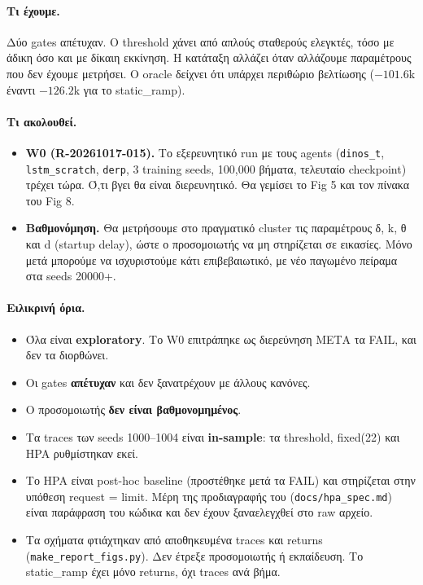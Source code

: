 \documentclass[11pt,a4paper]{article}
\newcommand{\kode}[1]{\texttt{#1}}
\begin{document}
\paragraph{Τι έχουμε.} Δύο gates απέτυχαν. Ο threshold χάνει από απλούς σταθερούς ελεγκτές, τόσο με άδικη όσο και με δίκαιη εκκίνηση. Η κατάταξη αλλάζει όταν αλλάζουμε παραμέτρους που δεν έχουμε μετρήσει. Ο oracle δείχνει ότι υπάρχει περιθώριο βελτίωσης ($-101.6$k έναντι $-126.2$k για το static\_ramp).

\paragraph{Τι ακολουθεί.}
\begin{itemize}
\item \textbf{W0 (R-20261017-015).} Το εξερευνητικό run με τους agents (\kode{dinos\_t}, \kode{lstm\_scratch}, \kode{derp}, 3 training seeds, 100,000 βήματα, τελευταίο checkpoint) τρέχει τώρα. Ό,τι βγει θα είναι διερευνητικό. Θα γεμίσει το Fig 5 και τον πίνακα του Fig 8.
\item \textbf{Βαθμονόμηση.} Θα μετρήσουμε στο πραγματικό cluster τις παραμέτρους δ, k, θ και d (startup delay), ώστε ο προσομοιωτής να μη στηρίζεται σε εικασίες. Μόνο μετά μπορούμε να ισχυριστούμε κάτι επιβεβαιωτικό, με νέο παγωμένο πείραμα στα seeds 20000+.
\end{itemize}

\paragraph{Ειλικρινή όρια.}
\begin{itemize}
\item Όλα είναι \textbf{exploratory}. Το W0 επιτράπηκε ως διερεύνηση ΜΕΤΑ τα FAIL, και δεν τα διορθώνει.
\item Οι gates \textbf{απέτυχαν} και δεν ξανατρέχουν με άλλους κανόνες.
\item Ο προσομοιωτής \textbf{δεν είναι βαθμονομημένος}.
\item Τα traces των seeds 1000--1004 είναι \textbf{in-sample}: τα threshold, fixed(22) και HPA ρυθμίστηκαν εκεί.
\item Το HPA είναι post-hoc baseline (προστέθηκε μετά τα FAIL) και στηρίζεται στην υπόθεση request = limit. Μέρη της προδιαγραφής του (\kode{docs/hpa\_spec.md}) είναι παράφραση του κώδικα και δεν έχουν ξαναελεγχθεί στο raw αρχείο.
\item Τα σχήματα φτιάχτηκαν από αποθηκευμένα traces και returns (\kode{make\_report\_figs.py}). Δεν έτρεξε προσομοιωτής ή εκπαίδευση. Το static\_ramp έχει μόνο returns, όχι traces ανά βήμα.
\end{itemize}
\end{document}
